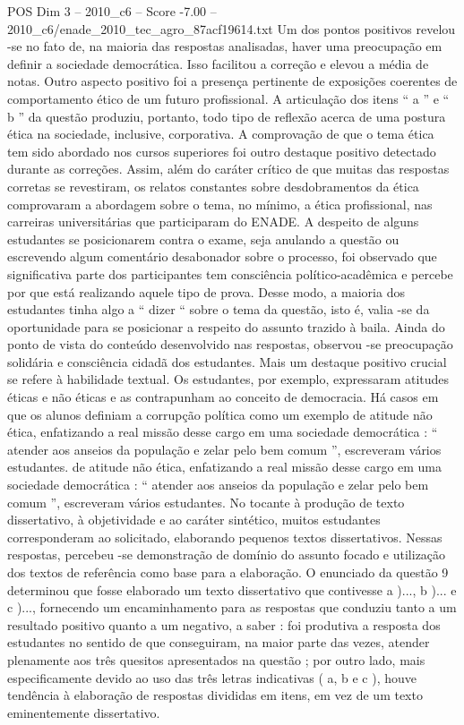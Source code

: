 \begin{textsample}{POS Dim 3 – 2010\_c6 – Score -7.00 – 2010\_c6/enade\_2010\_tec\_agro\_87acf19614.txt}
Um dos pontos positivos revelou -se no fato de, na maioria das respostas analisadas, haver uma preocupação em definir a sociedade democrática.
Isso facilitou a correção e elevou a média de notas.
Outro aspecto positivo foi a presença pertinente de exposições coerentes de comportamento ético de um futuro profissional.
A articulação dos itens “ a ” e “ b ” da questão produziu, portanto, todo tipo de reflexão acerca de uma postura ética na sociedade, inclusive, corporativa.
A comprovação de que o tema ética tem sido abordado nos cursos superiores foi outro destaque positivo detectado durante as correções.
Assim, além do caráter crítico de que muitas das respostas corretas se revestiram, os relatos constantes sobre desdobramentos da ética comprovaram a abordagem sobre o tema, no mínimo, a ética profissional, nas carreiras universitárias que participaram do ENADE.
A despeito de alguns estudantes se posicionarem contra o exame, seja anulando a questão ou escrevendo algum comentário desabonador sobre o processo, foi observado que significativa parte dos participantes tem consciência político-acadêmica e percebe por que está realizando aquele tipo de prova.
Desse modo, a maioria dos estudantes tinha algo a “ dizer “ sobre o tema da questão, isto é, valia -se da oportunidade para se posicionar a respeito do assunto trazido à baila.
Ainda do ponto de vista do conteúdo desenvolvido nas respostas, observou -se preocupação solidária e consciência cidadã dos estudantes.
Mais um destaque positivo crucial se refere à habilidade textual.
Os estudantes, por exemplo, expressaram atitudes éticas e não éticas e as contrapunham ao conceito de democracia.
Há casos em que os alunos definiam a corrupção política como um exemplo de atitude não ética, enfatizando a real missão desse cargo em uma sociedade democrática : “ atender aos anseios da população e zelar pelo bem comum ”, escreveram vários estudantes. de atitude não ética, enfatizando a real missão desse cargo em uma sociedade democrática : “ atender aos anseios da população e zelar pelo bem comum ”, escreveram vários estudantes.
No tocante à produção de texto dissertativo, à objetividade e ao caráter sintético, muitos estudantes corresponderam ao solicitado, elaborando pequenos textos dissertativos.
Nessas respostas, percebeu -se demonstração de domínio do assunto focado e utilização dos textos de referência como base para a elaboração.
O enunciado da questão 9 determinou que fosse elaborado um texto dissertativo que contivesse a )..., b )... e c )..., fornecendo um encaminhamento para as respostas que conduziu tanto a um resultado positivo quanto a um negativo, a saber : foi produtiva a resposta dos estudantes no sentido de que conseguiram, na maior parte das vezes, atender plenamente aos três quesitos apresentados na questão ; por outro lado, mais especificamente devido ao uso das três letras indicativas ( a, b e c ), houve tendência à elaboração de respostas divididas em itens, em vez de um texto eminentemente dissertativo.

\end{textsample}
